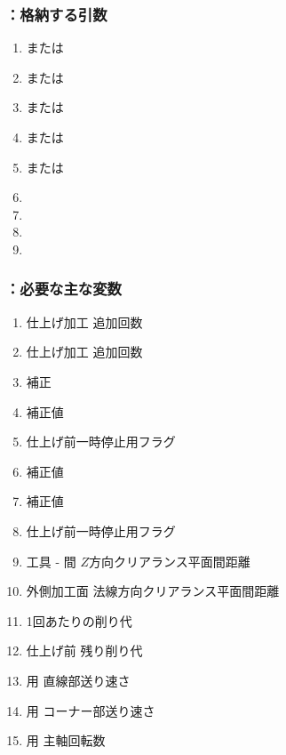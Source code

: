 \subsubsection{\KOutcutRLeft：格納する引数}
\begin{enumerate}[label*=\sarrow]
\item \PMTopOutcutACWidth または\PMBottomOutcutACWidth
\item \PMTopOutcutBDWidth または\PMBottomOutcutBDWidth
\item \PMTopOutcutCornerR または\PMBottomOutcutCornerR
\item \PMTopOutcutLength または\PMBottomOutcutLength
\item \PMTopReAlocationLength または\PMBottomReAlocationLength
\item \PMACOD
\item \PMBDOD
\item \PMKeywayPos
\item \PMKeywayWidth
\end{enumerate}

\subsubsection{\KOutcutRLeft：必要な主な変数}
\begin{enumerate}[label*=\sarrow]
\item \TopOutcut{} 仕上げ加工 追加回数
\item \BottomOutcut{} 仕上げ加工 追加回数
\item \TopOutcutAsideThickness 補正
\item \TopOutcutWidth 補正値
\item \TopOutcut{} 仕上げ前一時停止用フラグ
\item \BottomOutcutAsideThickness 補正値
\item \BottomOutcutWidth 補正値
\item \BottomOutcut{} 仕上げ前一時停止用フラグ
\item 工具 - \EndFace 間 $Z$方向クリアランス平面間距離
\item 外側加工面 法線方向クリアランス平面間距離
\item \OutcutMilling1回あたりの削り代
\item \OutcutMilling{} 仕上げ前 残り削り代
\item \OutcutMilling 用 直線部送り速さ
\item \OutcutMilling 用 コーナー部送り速さ
\item \OutcutMilling 用 主軸回転数
\end{enumerate}


